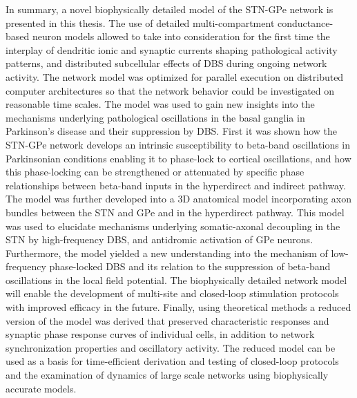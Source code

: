 %

In summary, a novel biophysically detailed model of the STN-GPe network is presented in
this thesis. The use of detailed multi-compartment conductance-based neuron models
allowed to take into consideration for the first time the interplay of dendritic ionic
and synaptic currents shaping pathological activity patterns, and distributed subcellular effects
of DBS during ongoing network activity. The network model was optimized for parallel
execution on distributed computer architectures so that the network behavior could be
investigated on reasonable time scales. The model was used to gain new insights into the
mechanisms underlying pathological oscillations in the basal ganglia in Parkinson’s
disease and their suppression by DBS. First it was shown how the STN-GPe network develops
an intrinsic susceptibility to beta-band oscillations in Parkinsonian conditions enabling
it to phase-lock to cortical oscillations, and how this phase-locking can be strengthened
or attenuated by specific phase relationships between beta-band inputs in the hyperdirect
and indirect pathway. The model was further developed into a 3D anatomical model
incorporating axon bundles between the STN and GPe and in the hyperdirect pathway. This
model was used to elucidate mechanisms underlying somatic-axonal decoupling in the STN by
high-frequency DBS, and antidromic activation of GPe neurons. Furthermore, the model
yielded a new understanding into the mechanism of low-frequency phase-locked DBS and its
relation to the suppression of beta-band oscillations in the local field potential. 
The biophysically detailed network model will enable the development of multi-site and
closed-loop stimulation protocols with improved efficacy in the future.
Finally, using theoretical methods a reduced version of the model was derived that 
preserved characteristic responses and synaptic phase response curves of individual cells,
in addition to network synchronization properties and oscillatory activity.
The reduced model can be used as a basis for time-efficient derivation and testing
of closed-loop protocols and the examination of dynamics of large scale networks 
using biophysically accurate models.